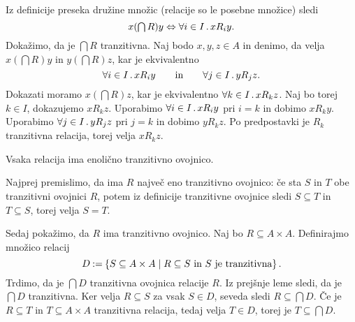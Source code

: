 \begin{dokaz}
  Iz definicije preseka družine množic (relacije so le posebne množice) sledi
  \begin{equation*}
  x (\textstyle\bigcap R) y \Leftrightarrow \forall i \in I \,.\, x R_i y.
  \end{equation*}
  Dokažimo, da je $\textstyle\bigcap R$ tranzitivna.
  Naj bodo $x, y, z \in A$ in denimo, da velja
  $x (\textstyle\bigcap R) y$ in $y (\textstyle\bigcap R) z$, kar je ekvivalentno
  \begin{equation*}
    \forall i \in I \,.\, x R_i y
    \qquad\text{in}\qquad
    \forall j \in I \,.\, y R_j z.
  \end{equation*}
  Dokazati moramo $x (\textstyle\bigcap R) z$, kar je ekvivalentno
  $\forall k \in I \,.\, x R_k z$.
  Naj bo torej $k \in I$, dokazujemo $x R_k z$. Uporabimo $\forall i \in I \,.\, x R_i y$ pri $i = k$ in dobimo $x R_k y$.
  Uporabimo $\forall j \in I \,.\, y R_j z$ pri $j = k$ in dobimo $y R_k z$.
  Po predpostavki je $R_k$ tranzitivna relacija, torej velja $x R_k z$.
\end{dokaz}

\begin{izrek}
  Vsaka relacija ima enolično tranzitivno ovojnico.
\end{izrek}

\begin{dokaz}
  Najprej premislimo, da ima $R$ največ eno tranzitivno ovojnico: če sta
  $S$ in $T$ obe tranzitivni ovojnici $R$, potem iz definicije tranzitivne ovojnice
  sledi $S \subseteq T$ in $T \subseteq S$, torej velja $S = T$.

  Sedaj pokažimo, da $R$ ima tranzitivno ovojnico. Naj bo $R \subseteq A \times A$. Definirajmo množico relacij
  \begin{equation*}
    D \mathbin{{:}{=}} \left\{ S \subseteq A \times A \; \middle| \; \text{$R \subseteq S$ in $S$ je tranzitivna} \right\}.
  \end{equation*}
  Trdimo, da je $\textstyle\bigcap D$ tranzitivna ovojnica relacije $R$.
  Iz prejšnje leme sledi, da je $\textstyle\bigcap D$ tranzitivna.
  Ker velja $R \subseteq S$ za vsak $S \in D$, seveda sledi $R \subseteq \textstyle\bigcap D$.
  Če je $R \subseteq T$ in $T \subseteq A \times A$ tranzitivna relacija, tedaj velja $T \in D$, torej je $T \subseteq \textstyle\bigcap D$.
\end{dokaz}


